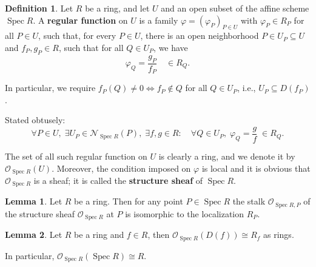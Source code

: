 \documentclass[12pt]{article}
\newlength{\myparskip}
\newenvironment{fullbox}{\begin{lrbox}{\savefullbox}\begin{minipage}{\dimexpr\textwidth-2\fboxsep\relax}\setlength{\parskip}{\myparskip}}{\end{minipage}\end{lrbox}\framebox[\textwidth]{\usebox{\savefullbox}}}
\theoremstyle{definition}
\newtheorem{lem}{Lemma}
\newtheorem{defn}{Definition}
\newenvironment{blem}{\begin{fullbox}\begin{lem}}{\end{lem}\end{fullbox}}
\newenvironment{bprop}{\begin{fullbox}\begin{lem}}{\end{lem}\end{fullbox}}
\newenvironment{bdefn}{\begin{fullbox}\begin{defn}}{\end{defn}\end{fullbox}}
\renewcommand{\phi}{\varphi}
\newcommand{\<}{\langle}
\renewcommand{\>}{\rangle}
\newcommand{\isom}{\cong}
\renewcommand{\O}{\mathscr{O}}
\DeclareMathOperator{\Spec}{Spec}
\begin{document}
\begin{bdefn}
    Let $R$ be a ring, and let $U$ and an open subset of the affine scheme $\Spec R$. A \textbf{regular function} on $U$ is a family $\phi = (\phi_P)_{P \in U}$ with $\phi_P \in R_P$ for all $P \in U$, such that, for every $P \in U$, there is an open neighborhood $P \in U_P \subseteq U$ and $f_P, g_P \in R$, such that for all $Q \in U_P$, we have
    \[
        \phi_Q = \frac{g_P}{f_P} \quad\in R_Q.
    \]
    
    In particular, we require $f_P(Q) \ne 0 \iff f_P \notin Q$ for all $Q \in U_P$, i.e., $U_P \subseteq D(f_P)$.

    Stated obtusely:
    \[
        \forall P \in U,\;
        \exists U_P \in \mathcal{N}_{\Spec R}(P),\;
        \exists f, g \in R :\quad 
        \forall Q \in U_P,\;
        \phi_Q = \frac{g}{f} \;\in R_Q.
    \]

    The set of all such regular function on $U$ is clearly a ring, and we denote it by $\O_{\Spec R}(U)$. Moreover, the condition imposed on $\phi$ is local and it is obvious that $\O_{\Spec R}$ is a sheaf; it is called the \textbf{structure sheaf} of $\Spec R$.
\end{bdefn}

\begin{blem}
    Let $R$ be a ring. Then for any point $P \in \Spec R$ the stalk $\O_{\Spec R, P}$ of the structure sheaf $\O_{\Spec R}$ at $P$ is isomorphic to the localization $R_P$.
\end{blem}

\begin{bprop}
    Let $R$ be a ring and $f \in R$, then $\O_{\Spec R}(D(f)) \isom R_f$ as rings.

    In particular, $\O_{\Spec R}(\Spec R) \isom R$.
\end{bprop}
\end{document}
